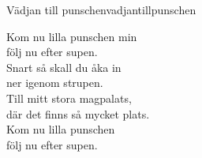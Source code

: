 \begin{song}{Vädjan till punschen}{vadjantillpunschen}
\begin{vers}
Kom nu lilla punschen min\\
följ nu efter supen.\\
Snart så skall du åka in\\
ner igenom strupen.\\
Till mitt stora magpalats,\\
där det finns så mycket plats.\\
Kom nu lilla punschen \\
följ nu efter supen.\\
\end{vers}
\end{song}
